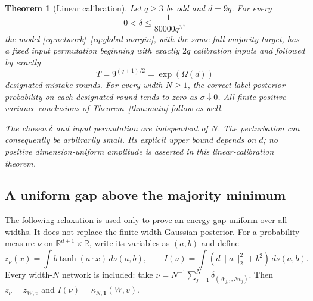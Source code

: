 \documentclass[11pt]{article}
\newtheorem{theorem}{Theorem}
\newcommand{\R}{\mathbb R}
\begin{document}
\begin{theorem}[Linear calibration]\label{thm:short}
Let $q\ge3$ be odd and $d=9q$. For every
\begin{equation}\label{eq:explicit-delta}
 0<\delta\le\frac{1}{80000q^3},
\end{equation}
the model
\eqref{eq:network}--\eqref{eq:global-margin}, with the same full-majority
target, has a fixed input permutation beginning with exactly $2q$
calibration inputs and followed by exactly
\begin{equation}\label{eq:short-count}
 T=9^{(q+1)/2}=\exp(\Omega(d))
\end{equation}
designated mistake rounds. For every width $N\ge1$, the correct-label
posterior probability on each designated round tends to zero as
$\sigma\downarrow0$. All finite-positive-variance conclusions of
Theorem~\ref{thm:main} follow as well.

The chosen $\delta$ and input permutation are independent of $N$.
The perturbation can consequently be arbitrarily small. Its explicit
upper bound depends on $d$; no positive dimension-uniform amplitude
is asserted in this linear-calibration theorem.
\end{theorem}

\subsection{A uniform gap above the majority minimum}

The following relaxation is used only to prove an energy gap uniform
over all widths. It does not replace the finite-width Gaussian posterior.
For a probability measure $\nu$ on $\R^{d+1}\times\R$, write its
variables as $(a,b)$ and define
\begin{equation}\label{eq:measure-model}
 z_\nu(x)=\int b\tanh(a\cdot\bar x)\,d\nu(a,b),\qquad
 I(\nu)=\int(d\|a\|_2^2+b^2)\,d\nu(a,b).
\end{equation}
Every width-$N$ network is included: take
$\nu=N^{-1}\sum_{j=1}^N\delta_{(W_{j,:},Nv_j)}$.
Then $z_\nu=z_{W,v}$ and $I(\nu)=\kappa_{N,\boldsymbol 1}(W,v)$.
\end{document}
